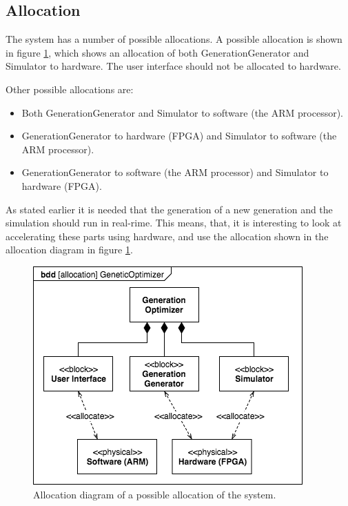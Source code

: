 \subsection{Allocation}
The system has a number of possible allocations. A possible allocation is shown in figure \ref{fig:allocation}, which shows an allocation of both GenerationGenerator and Simulator to hardware. The user interface should not be allocated to hardware.

Other possible allocations are: \begin{itemize} 
\item Both GenerationGenerator and Simulator to software (the ARM processor).
\item GenerationGenerator to hardware (FPGA) and Simulator to software (the ARM processor).
\item GenerationGenerator to software (the ARM processor) and Simulator to hardware (FPGA).
\end{itemize}

As stated earlier it is needed that the generation of a new generation and the simulation should run in real-rime. This means, that, it is interesting to look at accelerating these parts using hardware, and use the allocation shown in the allocation diagram in figure \ref{fig:allocation}.

\begin{figure}[htbp]
\begin{centering}
\includegraphics[width=0.9\linewidth]{../diagrams/allocation.png}
\caption{Allocation diagram of a possible allocation of the system.}
\label{fig:allocation}
\end{centering}
\end{figure}


